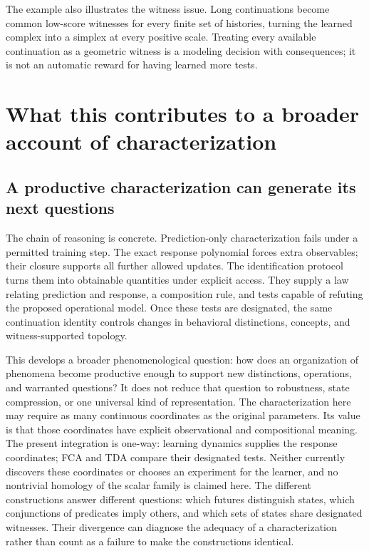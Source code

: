\documentclass[11pt]{article}
\theoremstyle{definition}\newtheorem{definition}[theorem]{Definition}
\theoremstyle{remark}\newtheorem{remark}[theorem]{Remark}
\begin{document}
The example also illustrates the witness issue. Long continuations become
common low-score witnesses for every finite set of histories, turning the
learned complex into a simplex at every positive scale. Treating every
available continuation as a geometric witness is a modeling decision with
consequences; it is not an automatic reward for having learned more tests.


\section{What this contributes to a broader account of characterization}

\subsection{A productive characterization can generate its next questions}
The chain of reasoning is concrete. Prediction-only characterization fails
under a permitted training step. The exact response polynomial forces extra
observables; their closure supports all further allowed updates. The
identification protocol turns them into obtainable quantities under explicit
access. They supply a law relating prediction and response, a composition
rule, and tests capable of refuting the proposed operational model. Once
these tests are designated, the same continuation identity controls changes
in behavioral distinctions, concepts, and witness-supported topology.

This develops a broader phenomenological question: how does an organization
of phenomena become productive enough to support new distinctions,
operations, and warranted questions? It does not reduce that question to
robustness, state compression, or one universal kind of representation.
The characterization here may require as many continuous coordinates as the
original parameters. Its value is that those coordinates have explicit
observational and compositional meaning. The present integration is one-way: learning dynamics supplies the
response coordinates; FCA and TDA compare their designated tests. Neither
currently discovers these coordinates or chooses an experiment for the
learner, and no nontrivial homology of the scalar family is claimed here.
The different constructions answer different questions: which futures distinguish states, which conjunctions
of predicates imply others, and which sets of states share designated
witnesses. Their divergence can diagnose the adequacy of a characterization
rather than count as a failure to make the constructions identical.
\end{document}
